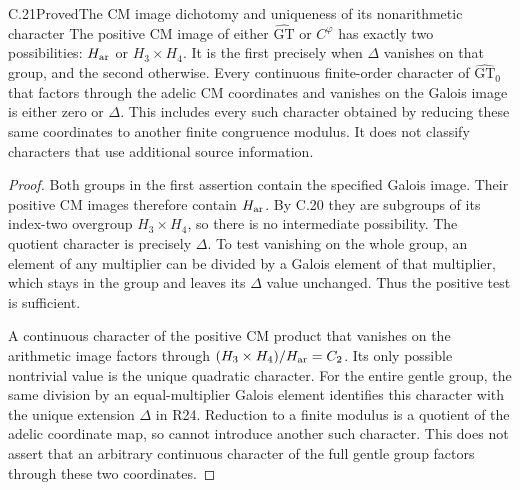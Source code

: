 \begin{statement}{C.21}{Proved}{The CM image dichotomy and uniqueness of its nonarithmetic character}
The positive CM image of either
$\widehat{\mathrm{GT}}$ or $C^\varphi$ has exactly
two possibilities: $H_{\rm ar}$ or $H_3\times H_4$.
It is the first precisely when $\Delta$ vanishes
on that group, and the second otherwise.
Every continuous finite-order character of
$\widehat{\mathrm{GT}}_0$ that factors through the
adelic CM coordinates and vanishes on the Galois
image is either zero or $\Delta$.
This includes every such character obtained by
reducing these same coordinates to another finite
congruence modulus. It does not classify characters
that use additional source information.
\end{statement}
\begin{proof}
Both groups in the first assertion contain the
specified Galois image. Their positive CM images
therefore contain $H_{\rm ar}$. By C.20 they are
subgroups of its index-two overgroup
$H_3\times H_4$, so there is no intermediate
possibility. The quotient character is precisely
$\Delta$. To test vanishing on the whole group,
an element of any multiplier can be divided by
a Galois element of that multiplier, which stays
in the group and leaves its $\Delta$ value unchanged.
Thus the positive test is sufficient.

A continuous character of the positive CM product
that vanishes on the arithmetic image factors
through $(H_3\times H_4)/H_{\rm ar}=C_2$.
Its only possible nontrivial value is the unique
quadratic character. For the entire gentle group,
the same division by an equal-multiplier Galois
element identifies this character with the unique
extension $\Delta$ in R24. Reduction to a finite
modulus is a quotient of the adelic coordinate map,
so cannot introduce another such character. This
does not assert that an arbitrary continuous
character of the full gentle group factors through
these two coordinates.
\end{proof}

